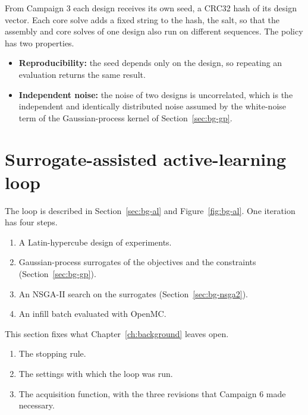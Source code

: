 From Campaign 3 each design receives its own seed, a CRC32 hash of its
design vector. Each core solve adds a fixed string to the hash, the
salt, so that the assembly and core solves of one design also run on
different sequences. The policy has two properties.

\begin{itemize}
  \item \textbf{Reproducibility:} the seed depends only on the design,
        so repeating an evaluation returns the same result.

  \item \textbf{Independent noise:} the noise of two designs is
        uncorrelated, which is the independent and identically
        distributed noise assumed by the white-noise term of the
        Gaussian-process kernel of Section~\ref{sec:bg-gp}.
\end{itemize}

\label{sec:meth-stats}\label{eq:noise-margin-set}

\section{Surrogate-assisted active-learning loop}
\label{sec:meth-loop}

The loop is described in Section~\ref{sec:bg-al} and
Figure~\ref{fig:bg-al}. One iteration has four steps.

\begin{enumerate}
  \item A Latin-hypercube design of experiments.

  \item Gaussian-process surrogates of the objectives and the
        constraints (Section~\ref{sec:bg-gp}).

  \item An NSGA-II search on the surrogates
        (Section~\ref{sec:bg-nsga2}).

  \item An infill batch evaluated with OpenMC.
\end{enumerate}

This section fixes what Chapter~\ref{ch:background} leaves open.

\begin{enumerate}
  \item The stopping rule.

  \item The settings with which the loop was run.

  \item The acquisition function, with the three revisions that
        Campaign 6 made necessary.
\end{enumerate}

